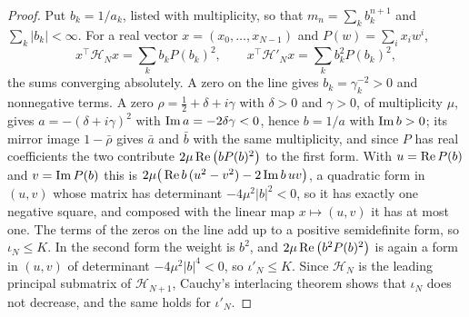 \begin{proof}
Put $b_k=1/a_k$, listed with multiplicity, so that $m_n=\sum_kb_k^{n+1}$ and $\sum_k|b_k|<\infty$. For a real vector $x=(x_0,\dots,x_{N-1})$ and $P(w)=\sum_ix_iw^i$,
\[
x^\top\mathcal H_Nx=\sum_kb_kP(b_k)^2,\qquad x^\top\mathcal H'_Nx=\sum_kb_k^2P(b_k)^2,
\]
the sums converging absolutely. A zero on the line gives $b_k=\gamma_k^{-2}>0$ and nonnegative terms. A zero $\rho=\frac12+\delta+i\gamma$ with $\delta>0$ and $\gamma>0$, of multiplicity $\mu$, gives $a=-(\delta+i\gamma)^2$ with $\operatorname{Im} a=-2\delta\gamma<0$, hence $b=1/a$ with $\operatorname{Im} b>0$; its mirror image $1-\bar\rho$ gives $\bar a$ and $\bar b$ with the same multiplicity, and since $P$ has real coefficients the two contribute $2\mu\operatorname{Re}\big(bP(b)^2\big)$ to the first form. With $u=\operatorname{Re} P(b)$ and $v=\operatorname{Im} P(b)$ this is $2\mu\big(\operatorname{Re} b\,(u^2-v^2)-2\operatorname{Im} b\,uv\big)$, a quadratic form in $(u,v)$ whose matrix has determinant $-4\mu^2|b|^2<0$, so it has exactly one negative square, and composed with the linear map $x\mapsto(u,v)$ it has at most one. The terms of the zeros on the line add up to a positive semidefinite form, so $\iota_N\le K$. In the second form the weight is $b^2$, and $2\mu\operatorname{Re}\big(b^2P(b)^2\big)$ is again a form in $(u,v)$ of determinant $-4\mu^2|b|^4<0$, so $\iota'_N\le K$. Since $\mathcal H_N$ is the leading principal submatrix of $\mathcal H_{N+1}$, Cauchy's interlacing theorem shows that $\iota_N$ does not decrease, and the same holds for $\iota'_N$.


\end{proof}
